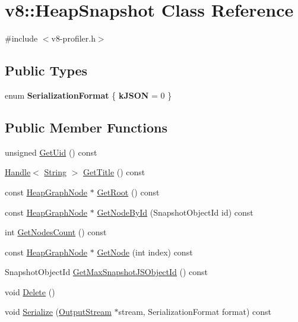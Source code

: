 \hypertarget{classv8_1_1HeapSnapshot}{\section{v8\-:\-:Heap\-Snapshot Class Reference}
\label{classv8_1_1HeapSnapshot}
}


{\ttfamily \#include $<$v8-\/profiler.\-h$>$}

\subsection*{Public Types}
\begin{DoxyCompactItemize}
\item 
enum {\bfseries Serialization\-Format} \{ {\bfseries k\-J\-S\-O\-N} =  0
 \}
\end{DoxyCompactItemize}
\subsection*{Public Member Functions}
\begin{DoxyCompactItemize}
\item 
unsigned \hyperlink{classv8_1_1HeapSnapshot_a8096d1dc0b99fbffc0f0618be8472ca7}{Get\-Uid} () const 
\item 
\hyperlink{classv8_1_1Handle}{Handle}$<$ \hyperlink{classv8_1_1String}{String} $>$ \hyperlink{classv8_1_1HeapSnapshot_a54d5d9e0234c2ee361892ea598624a82}{Get\-Title} () const 
\item 
const \hyperlink{classv8_1_1HeapGraphNode}{Heap\-Graph\-Node} $\ast$ \hyperlink{classv8_1_1HeapSnapshot_aafd7abe35ce29f9874de6687c65bf2af}{Get\-Root} () const 
\item 
const \hyperlink{classv8_1_1HeapGraphNode}{Heap\-Graph\-Node} $\ast$ \hyperlink{classv8_1_1HeapSnapshot_a023696f94fe538380922bf2c40c97b7b}{Get\-Node\-By\-Id} (Snapshot\-Object\-Id id) const 
\item 
int \hyperlink{classv8_1_1HeapSnapshot_aaa2182a442eedf26d509cc3ddc623cc5}{Get\-Nodes\-Count} () const 
\item 
const \hyperlink{classv8_1_1HeapGraphNode}{Heap\-Graph\-Node} $\ast$ \hyperlink{classv8_1_1HeapSnapshot_ae67eb5a68dd648516f9d3879137d5c51}{Get\-Node} (int index) const 
\item 
Snapshot\-Object\-Id \hyperlink{classv8_1_1HeapSnapshot_a4a0fc79b7ef74a3a5ea3450b2354d8ed}{Get\-Max\-Snapshot\-J\-S\-Object\-Id} () const 
\item 
void \hyperlink{classv8_1_1HeapSnapshot_aeaa6073009e4041839dff7a860d2548a}{Delete} ()
\item 
void \hyperlink{classv8_1_1HeapSnapshot_acf7383deaa06fab1d948fd7e737ac7d3}{Serialize} (\hyperlink{classv8_1_1OutputStream}{Output\-Stream} $\ast$stream, Serialization\-Format format) const 
\end{DoxyCompactItemize}


